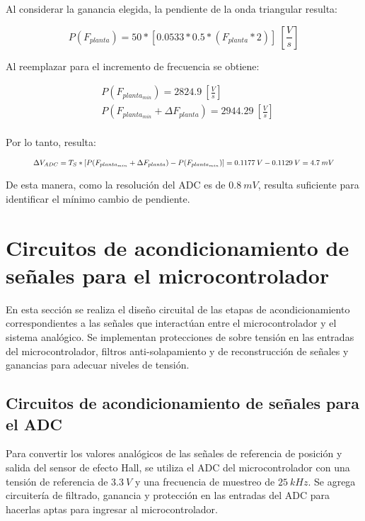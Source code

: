 Al considerar la ganancia elegida,  la pendiente de la onda triangular resulta:

\begin{equation} 
	P(F_{planta}) = 50 * [0.0533 * 0.5 * (F_{planta}*2)]\:[\frac{V}{s}]
\end{equation}

 Al reemplazar para el incremento de frecuencia se obtiene: 

\begin{equation*} 
	\begin{aligned}
		&P(F_{planta_{min}}) = 2824.9 \: [\frac{V}{s}]\\
		&P(F_{planta_{min}} + \Delta F_{planta}) = 2944.29 \: [\frac{V}{s}]\\		 
	\end{aligned}
\end{equation*}

 Por lo tanto, resulta:


\begin{equation*} 
	\resizebox{.9\hsize}{!}
	{
	$\Delta V_{ADC} = T_S * [P(F_{planta_{min}} + \Delta F_{planta}) - P(F_{planta_{min}})] = 0.1177\:V - 0.1129\:V = 4.7\:mV$
	}
\end{equation*}


 De esta manera, como la resolución del ADC es de $0.8\:mV$, resulta suficiente para identificar el mínimo cambio de pendiente.


\section{Circuitos de acondicionamiento de señales para el microcontrolador}
En esta sección se realiza el diseño circuital de las etapas de acondicionamiento correspondientes a las señales que interactúan entre el microcontrolador y el sistema analógico. Se implementan protecciones de sobre tensión en las entradas del microcontrolador, filtros anti-solapamiento y de reconstrucción de señales y ganancias para adecuar niveles de tensión.

\subsection{Circuitos de acondicionamiento de señales para el ADC}

 Para convertir los valores analógicos de las señales de referencia de posición y salida del sensor de efecto Hall, se utiliza el ADC del microcontrolador con una tensión de referencia de $3.3\:V$ y una frecuencia de muestreo de $25\:kHz$. Se agrega circuitería de filtrado, ganancia y protección en las entradas del ADC para hacerlas aptas para ingresar al microcontrolador.
 
